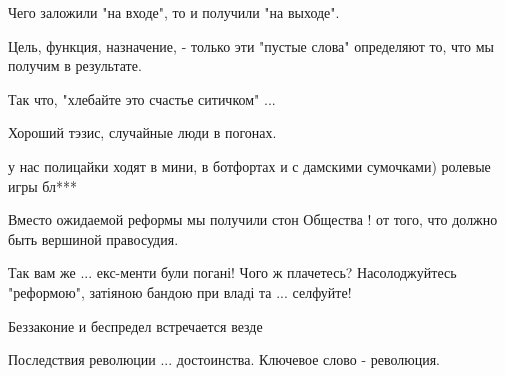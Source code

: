 \begin{itemize}
Чего заложили "на входе", то и получили "на выходе".

Цель, функция, назначение, - только эти "пустые слова" определяют то, что мы
получим в результате.

Так что, "хлебайте это счастье ситичком" ...

Хороший тэзис, случайные люди в погонах.

у нас полицайки ходят в мини, в ботфортах и с дамскими сумочками) ролевые игры бл***

Вместо ожидаемой реформы мы получили стон Общества ! от того, что должно быть вершиной правосудия.

Так вам же ... екс-менти були погані! Чого ж плачетесь? Насолоджуйтесь "реформою", затіяною бандою при владі та ... селфуйте!

Беззаконие и беспредел встречается везде

Последствия революции ... достоинства. Ключевое слово - революция.

\end{itemize} %
